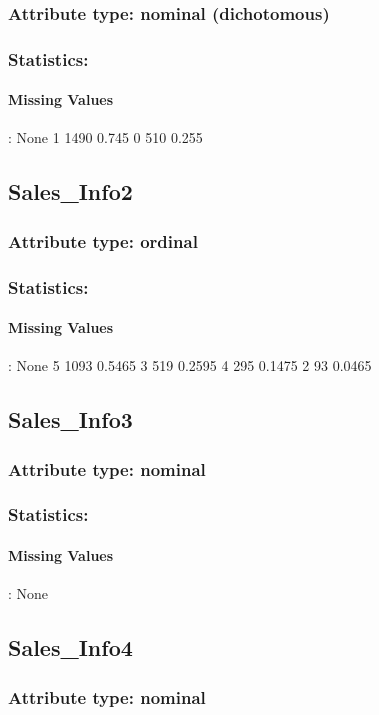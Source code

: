 \subsubsection{Attribute type: nominal (dichotomous)}
\subsubsection{Statistics: }
\paragraph{Missing Values}: None
1	1490	0.745
0	510	0.255

\subsection{Sales\_Info2}
\subsubsection{Attribute type: ordinal}
\subsubsection{Statistics: }
\paragraph{Missing Values}: None
5	1093	0.5465
3	519	0.2595
4	295	0.1475
2	93	0.0465

\subsection{Sales\_Info3}
\subsubsection{Attribute type: nominal}
\subsubsection{Statistics: }
\paragraph{Missing Values}: None

\subsection{Sales\_Info4}
\subsubsection{Attribute type: nominal}

